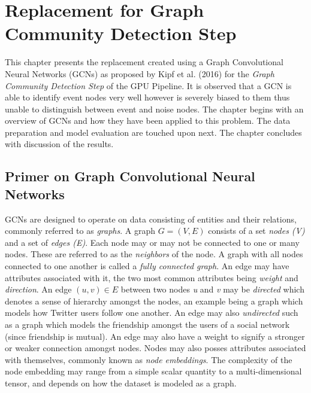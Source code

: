 
\chapter{Replacement for Graph Community Detection Step} %
\label{cha:gcn}
% 

This chapter presents the replacement created using a Graph
Convolutional Neural Networks (GCNs) as proposed by Kipf et al. (2016)
for the \emph{Graph Community Detection Step} of the GPU Pipeline. It
is observed that a GCN is able to identify event nodes very well
however is severely biased to them thus unable to distinguish between
event and noise nodes. The chapter begins with an overview of GCNs and
how they have been applied to this problem. The data preparation and
model evaluation are touched upon next. The chapter concludes with
discussion of the results.

\section{Primer on Graph Convolutional Neural Networks}
\label{sec:gcn-primer}

GCNs are designed to operate on data consisting of entities and their
relations, commonly referred to as \emph{graphs}. A graph $G = (V, E)$
consists of a set \emph{nodes (V)} and a set of \emph{edges (E)}. Each
node may or may not be connected to one or many nodes. These are
referred to as the \emph{neighbors} of the node. A graph with all
nodes connected to one another is called a \emph{fully connected
graph}. An edge may have attributes associated with it, the two most
common attributes being \emph{weight} and \emph{direction}. An edge
$(u, v) \in E$ between two nodes \emph{u} and \emph{v} may be
\emph{directed} which denotes a sense of hierarchy amongst the nodes,
an example being a graph which models how Twitter users follow one
another. An edge may also \emph{undirected} such as a graph which
models the friendship amongst the users of a social network (since
friendship is mutual). An edge may also have a weight to signify a
stronger or weaker connection amongst nodes. Nodes may also posses
attributes associated with themselves, commonly known as \emph{node
embeddings}. The complexity of the node embedding may range from a
simple scalar quantity to a multi-dimensional tensor, and depends on
how the dataset is modeled as a graph.


